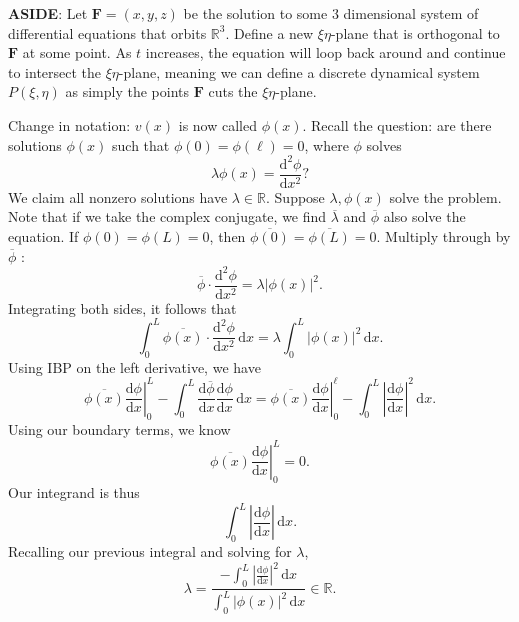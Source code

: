 \textbf{ASIDE}: Let $\mathbf{F}=(x,y,z)$ be the solution to some 3 dimensional system of differential equations that orbits $\mathbb{R}^3$. Define a new $\xi \eta $-plane that is orthogonal to $\mathbf{F}$ at some point. As $t$ increases, the equation will loop back around and continue to intersect the $\xi \eta $-plane, meaning we can define a discrete dynamical system $P(\xi ,\eta )$ as simply the points $\mathbf{F}$ cuts the $\xi \eta $-plane.

Change in notation: $v(x)$ is now called $\phi (x)$. Recall the question: are there solutions $\phi (x)$ such that $\phi (0)=\phi (\ell )=0$, where $\phi $ solves
\[
	\lambda \phi (x)=\frac{\mathrm{d}^2\phi }{\mathrm{d}x^2} 
?\]
We claim all nonzero solutions have $\lambda \in\mathbb{R}$. Suppose $\lambda ,\phi (x)$ solve the problem. Note that if we take the complex conjugate, we find  $\overline{\lambda} $ and $\overline{\phi } $ also solve the equation. If $\phi (0)=\phi (L)=0$, then $\overline{\phi (0)} =\overline{\phi (L)} =0$. Multiply through by $\overline{\phi  } $ :
\[
	\overline{\phi }\cdot  \frac{\mathrm{d}^2\phi }{\mathrm{d}x^2} =\lambda \left| \phi (x) \right| ^2
.\]
Integrating both sides, it follows that
\[
	\int_{0}^{L} \overline{\phi (x)} \cdot \frac{\mathrm{d}^2\phi }{\mathrm{d}x^2}  \,\mathrm{d} x=\lambda \int_{0}^{L} \left| \phi (x) \right| ^2 \,\mathrm{d} x
.\]
Using IBP on the left derivative, we have
\[
	\left.\overline{\phi (x)} \frac{\mathrm{d}\phi }{\mathrm{d}x}\right|_{0}^{L} -\int_{0}^{L} \frac{\mathrm{d} \overline{\phi  }}{\mathrm{d}x} \frac{\mathrm{d}\phi }{\mathrm{d}x}  \,\mathrm{d} x = \left. \overline{\phi (x)} \frac{\mathrm{d}\phi }{\mathrm{d}x} \right|_{0}^{\ell }-\int_{0}^{L} \left| \frac{\mathrm{d}\phi }{\mathrm{d}x}  \right| ^2 \,\mathrm{d} x
.\]
Using our boundary terms, we know
\[
	\left.\overline{\phi (x)} \frac{\mathrm{d}\phi }{\mathrm{d}x}\right|_{0}^{L} =0
.\]
Our integrand is thus
\[
	\int_{0}^{L} \left| \frac{\mathrm{d}\phi }{\mathrm{d}x}  \right|  \,\mathrm{d} x
.\]
Recalling our previous integral and solving for $\lambda $,
\[
	\lambda =\frac{-\int_{0}^{L} \left| \frac{\mathrm{d}\phi }{\mathrm{d}x}  \right| ^2 \,\mathrm{d} x}{\int_{0}^{L} \left| \phi (x) \right| ^2 \,\mathrm{d} x}\in\mathbb{R}
.\]

